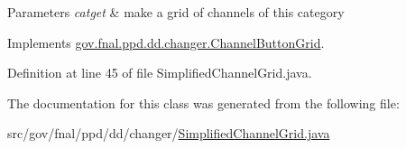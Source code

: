 \begin{DoxyParams}{Parameters}
{\em catget} & make a grid of channels of this category \\
\hline
\end{DoxyParams}


Implements \hyperlink{classgov_1_1fnal_1_1ppd_1_1dd_1_1changer_1_1ChannelButtonGrid_a5acf39593b87514d5015b219e91ddeac}{gov.\-fnal.\-ppd.\-dd.\-changer.\-Channel\-Button\-Grid}.



Definition at line 45 of file Simplified\-Channel\-Grid.\-java.



The documentation for this class was generated from the following file\-:\begin{DoxyCompactItemize}
\item 
src/gov/fnal/ppd/dd/changer/\hyperlink{SimplifiedChannelGrid_8java}{Simplified\-Channel\-Grid.\-java}\end{DoxyCompactItemize}
